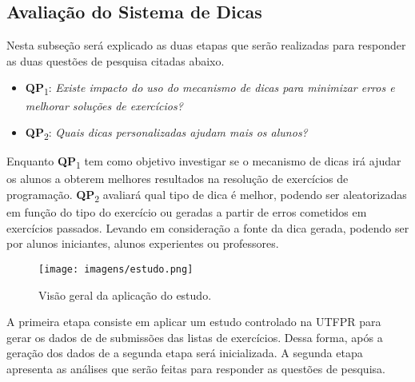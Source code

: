 \subsection{Avaliação do Sistema de Dicas}

Nesta subseção será explicado as duas etapas que serão realizadas para responder as duas questões de pesquisa citadas abaixo.

\begin{itemize}
	\item \textbf{QP}\textsubscript{1}: 
	\textit{Existe impacto do uso do mecanismo de dicas para minimizar erros e melhorar soluções de exercícios?}
	\foreign
	\item \textbf{QP}\textsubscript{2}: 
	\textit{Quais dicas personalizadas ajudam mais os alunos?}
\end{itemize}

Enquanto \textbf{QP}\textsubscript{1} tem como objetivo investigar se o mecanismo de dicas irá ajudar os alunos a obterem melhores resultados na resolução de exercícios de programação. \textbf{QP}\textsubscript{2} avaliará qual tipo de dica é melhor, podendo ser aleatorizadas em função do tipo do exercício ou geradas a partir de erros cometidos em exercícios passados. Levando em consideração a fonte da dica gerada, podendo ser por alunos iniciantes, alunos experientes ou professores.

\begin{figure}[ht]
	\centering
	\captionsetup{justification=centering}
	\texttt{[image: imagens/estudo.png]}
	\caption{Visão geral da aplicação do estudo.}
	\label{figura:estudo}
\end{figure}

A primeira etapa consiste em aplicar um estudo controlado na UTFPR para gerar os dados de  de submissões das listas de exercícios. Dessa forma, após a geração dos dados de  a segunda etapa será inicializada. A segunda etapa apresenta as análises que serão feitas para responder as questões de pesquisa.

